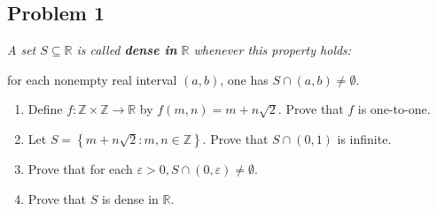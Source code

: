 \documentclass{article}
\newcommand{\Z}{{\mathbb Z}}
\newcommand{\R}{{\mathbb R}}
\newcommand{\ep}{{\varepsilon}}
\begin{document}
\subsection*{Problem 1}
{\it A set $S \subseteq \R$ is called {\bf dense in} $\R$ whenever this property holds:
\begin{center}
	for each nonempty real interval $(a,b)$, one has $S \cap (a,b) \neq \emptyset$.
\end{center}
\begin{enumerate}
	\item Define $f \colon \Z \times \Z \to \R$ by $f(m,n) = m + n\sqrt{2}$.
	Prove that $f$ is one-to-one.
	\item Let $S = \left\{m + n\sqrt{2} \colon m,n\in\Z \right\}$.
	Prove that $S \cap (0,1)$ is infinite.
	\item Prove that for each $\ep > 0, S \cap (0,\ep) \neq \emptyset$.
	\item Prove that $S$ is dense in $\R$.
\end{enumerate}}
\end{document}
